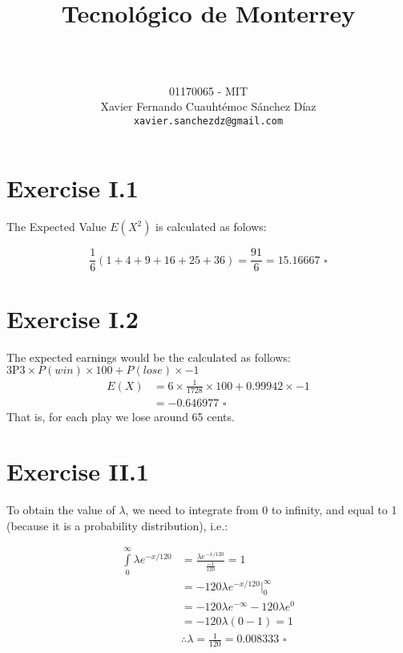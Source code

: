 \documentclass[titlepage, letterpaper]{article}
\title{
\vspace{1in}
\textbf{Tecnológico de Monterrey} \\
\vspace{0.5in}
\textmd{\mahclass} \\
\vspace{0.5in}
\textsc{\mahtitle}
\author{01170065  - MIT \\
Xavier Fernando Cuauhtémoc Sánchez Díaz \\
\texttt{xavier.sanchezdz@gmail.com}}
\date{\mahdate}
}
\newcommand{\qed}{\,\,\square}
\begin{document}
\begin{titlepage}
    \maketitle
\end{titlepage}

%
%

\section{Exercise I.1} %
\label{sec:exercise_i_1}

The Expected Value $E(X^2)$ is calculated as folows:

$$\dfrac{1}{6}(1 + 4 + 9 + 16 + 25 + 36) = \dfrac{91}{6} = 15.16667 \qed$$


\section{Exercise I.2} %
\label{sec:exercise_i_2}
The expected earnings would be the calculated as follows:
$3 \text{P}3 \times P(win) \times 100 + P(lose) \times -1 $
\begin{align}
    E(X) & = 6 \times \frac{1}{1728} \times 100 + 0.99942 \times -1 \\
    & = -0.646977\qed  
\end{align}
That is, for each play we lose around 65 cents.

\section{Exercise II.1} %
\label{sec:exercise_ii_1}
To obtain the value of $\lambda$, we need to integrate from 0 to infinity, and equal to 1 (because it is a probability distribution), i.e.:

\begin{align}
    \int\limits_0^\infty \lambda e^{-x/120} & = \frac{\lambda e^{-x/120}}{\tfrac{-1}{120}} = 1 \\
    & = -120\lambda e^{-x/120}\Big|_0^\infty \\[3ex]
    & = -120\lambda e^{-\infty} - 120\lambda e^0 \\
    & = -120\lambda (0 - 1) = 1 \\
    & \therefore \lambda = \frac{1}{120} = 0.008333 \qed
\end{align}
\end{document}
